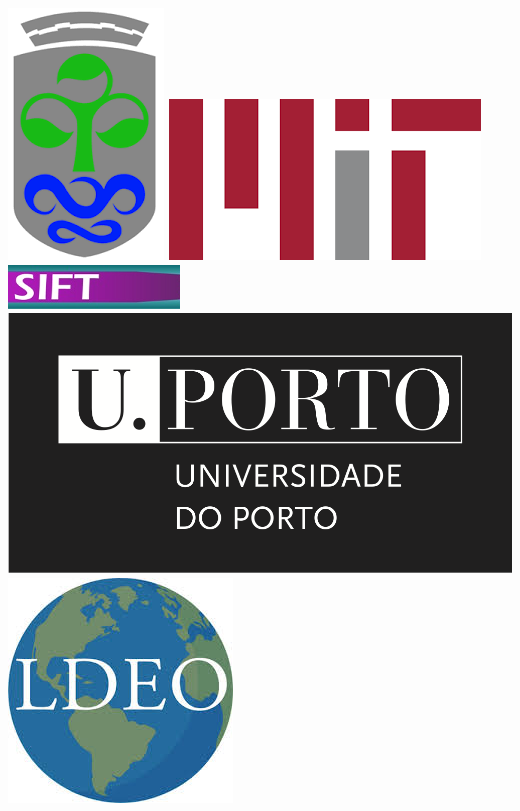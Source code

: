 \begin{titlepage}
\begin{center}
\includegraphics[scale=0.2]{fig/vigo.png}
\hspace{+0.6cm}\includegraphics[scale=0.15]{fig/mit.png}
\hspace{+0.6cm}\includegraphics[scale=0.9]{fig/Sift_logo.png}
\hspace{+0.6cm}\includegraphics[scale=0.25]{fig/uporto.png}
\hspace{+0.6cm}\includegraphics[scale=0.16]{fig/ldeo.jpg}

\end{center}
\end{titlepage}
